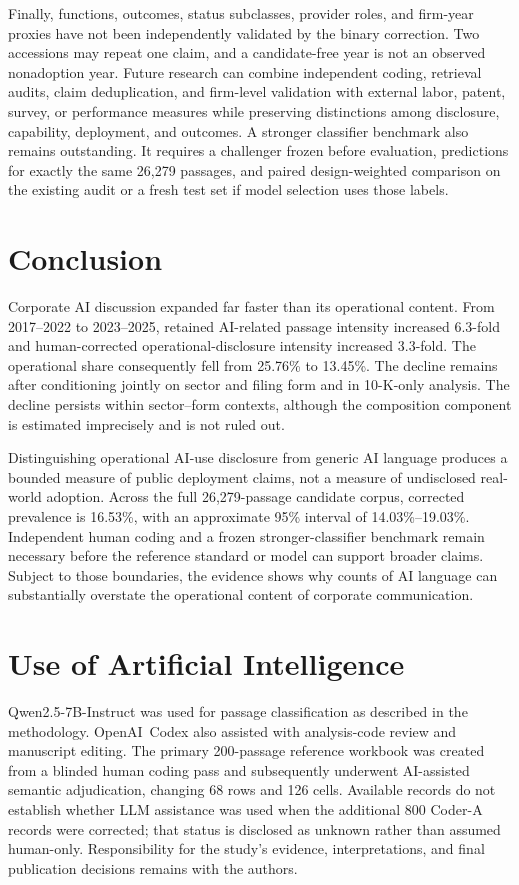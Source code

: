 \documentclass[12pt]{article}
\begin{document}
Finally, functions, outcomes, status subclasses, provider roles, and firm-year
proxies have not been independently validated by the binary correction.
Two accessions may repeat one claim, and a candidate-free year is not an
observed nonadoption year. Future research can combine independent coding,
retrieval audits, claim deduplication, and firm-level validation with external
labor, patent, survey, or performance measures while preserving distinctions
among disclosure, capability, deployment, and outcomes.
A stronger classifier benchmark also remains outstanding. It requires a
challenger frozen before evaluation, predictions for exactly the same 26,279
passages, and paired design-weighted comparison on the existing audit or a
fresh test set if model selection uses those labels.

\clearpage
\section{Conclusion}

Corporate AI discussion expanded far faster than its operational content.
From 2017--2022 to 2023--2025, retained AI-related passage intensity increased
6.3-fold and human-corrected operational-disclosure intensity increased
3.3-fold. The operational share consequently fell from 25.76\% to 13.45\%.
The decline remains after conditioning jointly on sector and filing form and
in 10-K-only analysis. The decline persists within sector--form contexts,
although the composition component is estimated imprecisely and is not
ruled out.

Distinguishing operational AI-use disclosure from generic AI language produces
a bounded measure of public deployment claims, not a measure of undisclosed
real-world adoption. Across the full 26,279-passage candidate corpus, corrected
prevalence is 16.53\%, with an approximate 95\% interval of
14.03\%--19.03\%. Independent human coding and a frozen stronger-classifier
benchmark remain necessary before the reference standard or model can support
broader claims. Subject to those boundaries, the evidence shows why counts of
AI language can substantially overstate the operational content of corporate
communication.

\section*{Use of Artificial Intelligence}

Qwen2.5-7B-Instruct was used for passage classification as described in the
methodology. \mbox{OpenAI Codex} also assisted with analysis-code review and manuscript
editing. The primary 200-passage reference workbook was created from a blinded
human coding pass and subsequently underwent AI-assisted semantic adjudication,
changing 68 rows and 126 cells. Available records do not establish whether LLM
assistance was used when the additional 800 Coder-A records were corrected;
that status is disclosed as unknown rather than assumed human-only.
Responsibility for the study's evidence, interpretations, and final publication
decisions remains with the authors.
\end{document}
